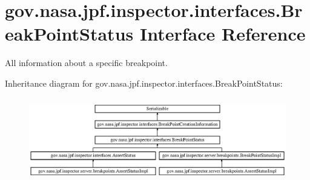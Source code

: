 \hypertarget{interfacegov_1_1nasa_1_1jpf_1_1inspector_1_1interfaces_1_1_break_point_status}{}\section{gov.\+nasa.\+jpf.\+inspector.\+interfaces.\+Break\+Point\+Status Interface Reference}
\label{interfacegov_1_1nasa_1_1jpf_1_1inspector_1_1interfaces_1_1_break_point_status}


All information about a specific breakpoint.  


Inheritance diagram for gov.\+nasa.\+jpf.\+inspector.\+interfaces.\+Break\+Point\+Status\+:\begin{figure}[H]
\begin{center}
\leavevmode
\includegraphics[height=3.674541cm]{interfacegov_1_1nasa_1_1jpf_1_1inspector_1_1interfaces_1_1_break_point_status}
\end{center}
\end{figure}
